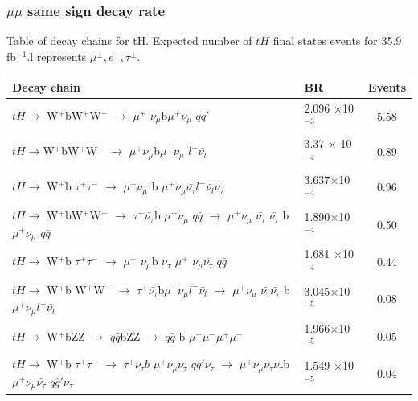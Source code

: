 \documentclass[11pt]{beamer}
\begin{document}
\begin{frame}
\frametitle{$\mu\mu$ same sign decay rate}
\tiny{Table of decay chains for tH.  Expected number of $tH$ final states events for 35.9 fb$^{-1}$.l represents $\mu^{\pm},e^- , \tau^\pm$. }
\begin{table}
\renewcommand{\arraystretch}{0.55}
\begin{tabular}{|p{8cm}|p{1.3cm}|c|}
\hline
Decay chain &BR&Events\\
\hline 
\tiny{$tH \rightarrow$ W$^+$bW$^+$W$^-$ $\rightarrow$ $\mu^+$ $\nu_\mu$b$\mu^+\nu_\mu$  $q \bar{q}'$ } &\tiny{2.096 $\times$10$^{-3}$} &  5.58  \\
\hline
\tiny{$tH \rightarrow $W$^+$bW$^+$W$^-$ $\rightarrow$ $\mu^+\nu_\mu$b$\mu^+\nu_\mu$ $l^- \bar{\nu_l}$ } &\tiny{3.37 $\times$ 10$^{-4}$} &0.89 \\
\hline
\tiny{$tH \rightarrow$ W$^+$b $\tau^+ \tau^-$ $\rightarrow$ $\mu^+ \nu_\mu$ b $ \mu^+ \nu_\mu \bar{\nu_\tau} l^-\bar{\nu_l} \nu_\tau$} &\tiny{3.637$\times$10$^{-4}$}&0.96 \\
\hline
\tiny{$tH \rightarrow$ W$^+$bW$^+$W$^-$ $\rightarrow$ $\tau^+ \bar{\nu_\tau}$b $\mu^+ \nu_\mu$  $q\bar{q}$ $\rightarrow$ $\mu^+ \nu_\mu$ $\bar{\nu_\tau}$ $\bar{\nu_\tau}$ b$\mu^+ \nu_\mu$  $q \bar{q}$} &\tiny{1.890$\times$10$^{-4}$}&0.50  \\
\hline
\tiny{$tH \rightarrow$ W$^+$b $\tau^+ \tau^-$ $\rightarrow$ $\mu^+$ $\nu_\mu$b $\nu_\tau$ $\mu^+$ $\nu_\mu \bar{\nu_\tau}$} $q \bar{q}$  &
\tiny{1.681 $\times$10$^{-4}$} & 0.44 \\
\hline
\tiny{$tH \rightarrow$ W$^+$b W$^+$W$^-$ $\rightarrow$ $\tau^+ \bar{\nu_\tau}$b$ \mu^+ \nu_\mu l^- \bar{\nu_l}$ $\rightarrow$ $\mu^+\nu_\mu$ $ \bar{\nu_\tau} \bar{\nu_\tau}$  b$ \mu^+ \nu_\mu l^- \bar{\nu_l}$} &\tiny{3.045$\times$10$^{-5}$}& 0.08\\
\hline
\tiny{$tH \rightarrow$ W$^+$bZZ $\rightarrow$ $q \bar{q}$bZZ $\rightarrow$ $q \bar{q} $ b $\mu^+ \mu^- \mu^+ \mu^-$} & \tiny{1.966$\times$10$^{-5}$} &0.05\\
\hline 
\tiny{$tH \rightarrow$ W$^+$b $\tau^+ \tau^-$ $\rightarrow$ $\tau^+ \bar{\nu_\tau}b$ $\mu^+ \nu_\mu \bar{\nu_\tau} $  $q\bar{q}' \nu_\tau$ $\rightarrow$  $\mu^+ \nu_\mu \bar{\nu_\tau}\bar{\nu_\tau} $b $\mu^+ \nu_\mu \bar{\nu_\tau} $  $q\bar{q}' \nu_\tau$ } &\tiny{1.549 $\times$10$^{-5}$} &  0.04  \\
\hline
\end{tabular}
\end{table}
\end{frame}
\end{document}
